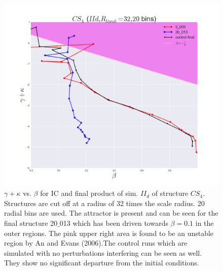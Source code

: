 \begin{figure}[!htbp]
\centering
\includegraphics[width=1.0\linewidth]{img/beta_vs_gamma_plus_kappa_IId_CS4_Rlimit32.png}
\caption{$\gamma + \kappa$ vs. $\beta$ for IC and final product of sim. $II_d$ of structure $CS_4$.
Structures are cut off at a radius of 32 times the scale radius. 20 radial bins are used.
The attractor is present and can be seen for the final structure 20$\_$013 which has been driven towards $\beta = 0.1$ in the outer regions. The pink upper right area is found to be an unstable region by An and Evans (2006).The control runs which are simulated with no perturbations interfering can be seen as well. They show no significant departure from the initial conditions.}
\label{fig:test}
\end{figure}

